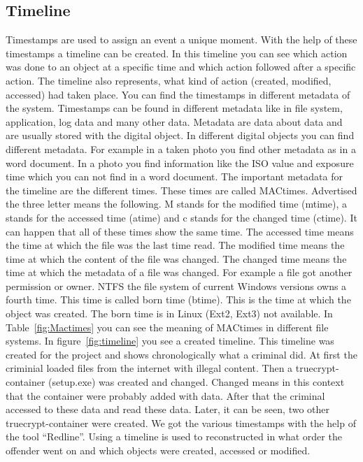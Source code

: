
\subsection{Timeline}
Timestamps are used to assign an event a unique moment. With the help of these timestamps a timeline can be created. In this timeline you can see which action was done to an object at a specific time and which action followed after a specific action. The timeline also  represents, what kind of action (created, modified, accessed) had taken place. You can find the timestamps in different metadata of the system. Timestamps can be found in different metadata like in file system, application, log data and many other data. Metadata are data about data and are usually stored with the digital object. In different digital objects you can find different metadata. For example in a taken photo you find other metadata as in a word document. In a photo you find information like the ISO value and exposure time which you can not find in a word document. The important metadata for the timeline are the different times. These times are called MACtimes. Advertised the three letter means the following. M stands for the modified time (mtime), a  stands for the accessed time (atime) and c stands for the changed time (ctime). It can happen that all of these times show the same time. The accessed time means the time at which the file was the last time read. The modified time means the time at which the content of the file was changed. The changed time means the time at which the metadata of a file was changed. For example a file got another permission or owner. NTFS the file system of current Windows versions owns a fourth time. This time is called born time (btime). This is the time at which the object was created. The born time is in Linux (Ext2, Ext3) not available. In Table~\ref{fig:Mactimes} you can see the meaning of MACtimes in different file systems. In figure~\ref{fig:timeline} you see a created timeline. This timeline was created for the project and shows chronologically what a criminal did. At first the criminial loaded files from the internet with illegal content. Then a truecrypt-container (setup.exe) was created and changed. Changed means in this context that the container were probably added with data. After that the criminal accessed to these data and read these data. Later, it can be seen, two other truecrypt-container were created. We got the various timestamps with the help of the tool “Redline”. Using a timeline is used to reconstructed in what order the offender went on and which objects were created, accessed or modified.

